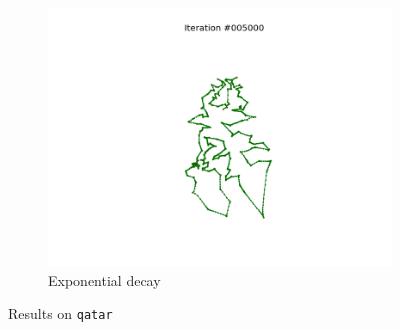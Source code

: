 \documentclass[11pt]{article}
\begin{document}
\begin{figure}
\begin{subfigure}{.33\textwidth}
  \includegraphics[trim={6cm 2cm 6cm 2cm}, clip=true,width=\linewidth]{q_e.png}
  \caption{Exponential decay}
\end{subfigure}
\caption{Results on \texttt{qatar}}
\label{fig:qatar}

\end{figure}
\end{document}
